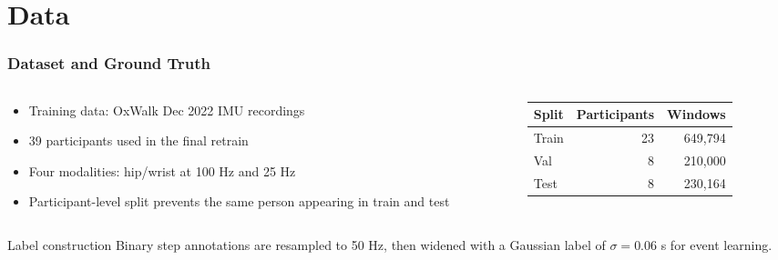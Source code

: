 \section{Data}

\begin{frame}
	\frametitle{Dataset and Ground Truth}
	\begin{columns}[t]
		\begin{column}{0.52\textwidth}
			\begin{itemize}
				\item Training data: OxWalk Dec 2022 IMU recordings
				\item 39 participants used in the final retrain
				\item Four modalities: hip/wrist at 100 Hz and 25 Hz
				\item Participant-level split prevents the same person appearing in train and test
			\end{itemize}
		\end{column}
		\begin{column}{0.44\textwidth}
			\begin{table}
				\centering
				\begin{tabular}{lrr}
					\toprule
					Split & Participants & Windows \\
					\midrule
					Train & 23 & 649,794 \\
					Val & 8 & 210,000 \\
					Test & 8 & 230,164 \\
					\bottomrule
				\end{tabular}
			\end{table}
		\end{column}
	\end{columns}

	\begin{exampleblock}{Label construction}
		Binary step annotations are resampled to 50 Hz, then widened with a Gaussian label of $\sigma=0.06$ s for event learning.
	\end{exampleblock}
\end{frame}
